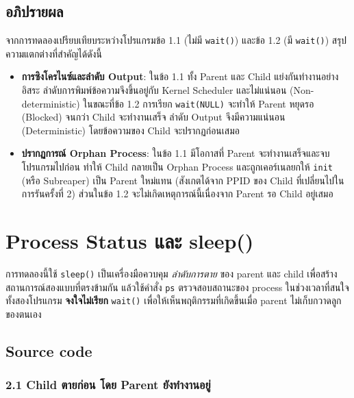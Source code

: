 \documentclass[a4paper,12pt]{article}
\newcommand{\code}[1]{\texttt{#1}}
\begin{document}
\subsection{อภิปรายผล}

จากการทดลองเปรียบเทียบระหว่างโปรแกรมข้อ 1.1 (ไม่มี \code{wait()}) และข้อ 1.2 (มี \code{wait()}) สรุปความแตกต่างที่สำคัญได้ดังนี้

\begin{itemize}[leftmargin=*]
  \item \textbf{การซิงโครไนซ์และลำดับ Output}:
        ในข้อ 1.1 ทั้ง Parent และ Child แย่งกันทำงานอย่างอิสระ ลำดับการพิมพ์ข้อความจึงขึ้นอยู่กับ Kernel Scheduler และไม่แน่นอน (Non-deterministic) ในขณะที่ข้อ 1.2 การเรียก \code{wait(NULL)} จะทำให้ Parent หยุดรอ (Blocked) จนกว่า Child จะทำงานเสร็จ ลำดับ Output จึงมีความแน่นอน (Deterministic) โดยข้อความของ Child จะปรากฏก่อนเสมอ

  \item \textbf{ปรากฏการณ์ Orphan Process}:
        ในข้อ 1.1 มีโอกาสที่ Parent จะทำงานเสร็จและจบโปรแกรมไปก่อน ทำให้ Child กลายเป็น Orphan Process และถูกเคอร์เนลยกให้ \code{init} (หรือ Subreaper) เป็น Parent ใหม่แทน (สังเกตได้จาก PPID ของ Child ที่เปลี่ยนไปในการรันครั้งที่ 2) ส่วนในข้อ 1.2 จะไม่เกิดเหตุการณ์นี้เนื่องจาก Parent รอ Child อยู่เสมอ
\end{itemize}

\newpage
\section{Process Status และ sleep()}

การทดลองนี้ใช้ \code{sleep()} เป็นเครื่องมือควบคุม \emph{ลำดับการตาย} ของ parent
และ child เพื่อสร้างสถานการณ์สองแบบที่ตรงข้ามกัน แล้วใช้คำสั่ง \code{ps}
ตรวจสอบสถานะของ process ในช่วงเวลาที่สนใจ ทั้งสองโปรแกรม \textbf{จงใจไม่เรียก}
\code{wait()} เพื่อให้เห็นพฤติกรรมที่เกิดขึ้นเมื่อ parent ไม่เก็บกวาดลูกของตนเอง

\subsection{Source code}

\subsubsection{2.1 Child ตายก่อน โดย Parent ยังทำงานอยู่}
\end{document}
